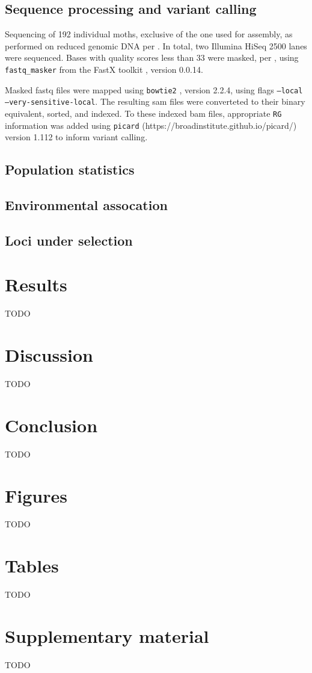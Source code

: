 \documentclass[fleqn,11pt]{wlpeerj}
\begin{document}
\subsection*{Sequence processing and variant calling} Sequencing of 192
individual moths, exclusive of the one used for assembly,  as performed on
reduced genomic DNA per \cite{PARCHMAN:2012ca}. In total, two  Illumina HiSeq
2500 lanes were sequenced. Bases with quality scores less than 33 were masked,
per \cite{Yun:2014dn},  using \texttt{fastq\_masker} from the FastX toolkit
\citep{citeulike:9103573}, version 0.0.14.

Masked fastq files were mapped using \texttt{bowtie2} \cite{Langmead:2012jh},
version 2.2.4, using flags \texttt{--local --very-sensitive-local}.  The
resulting  sam files were converteted to their binary equivalent, sorted, and
indexed. To  these indexed bam files, appropriate \texttt{RG} information was
added using \texttt{picard} (https://broadinstitute.github.io/picard/) version
1.112 to inform variant calling.

\subsection*{Population statistics}

\subsection*{Environmental assocation}

\subsection*{Loci under selection}


\subsection*{}

\section*{Results}
TODO


\section*{Discussion}
TODO


\section*{Conclusion}
TODO


\section*{Figures}
TODO

\section*{Tables}
TODO

\section*{Supplementary material}
TODO

\clearpage

\end{document}
